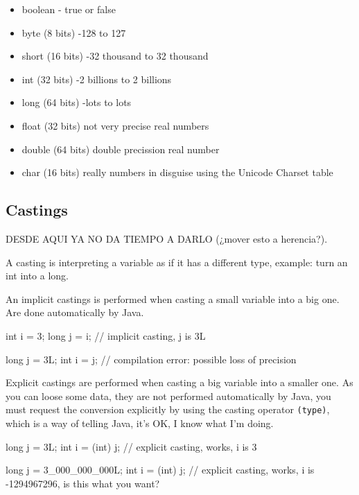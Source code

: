 \documentclass[8pt, a4paper, oneside]{extarticle}
\begin{document}
\begin{itemize}

  \item boolean - true or false

  \item byte (8 bits) -128 to 127

  \item short (16 bits) -32 thousand to 32 thousand

  \item int (32 bits) -2 billions to 2 billions

  \item long (64 bits) -lots to lots

  \item float (32 bits) not very precise real numbers

  \item double (64 bits) double precission real number

  \item char (16 bits) really numbers in disguise using the Unicode Charset table

\end{itemize}

\subsection{Castings}

DESDE AQUI YA NO DA TIEMPO A DARLO (¿mover esto a herencia?).

A casting is interpreting a variable as if it has a different type, example:
turn an int into a long.

An implicit castings is performed when casting a small variable into a big one.
Are done automatically by Java.

\begin{blackboard}
int i = 3;
long j = i; // implicit casting, j is 3L

long j = 3L;
int i = j; // compilation error: possible loss of precision
\end{blackboard}

Explicit castings are performed when casting a big variable into a smaller one.
As you can loose some data, they are not performed automatically by Java, you
must request the conversion explicitly by using the casting operator
\verb+(type)+, which is a way of telling Java, it's OK, I know what I'm doing.

\begin{blackboard}
long j = 3L;
int i = (int) j; // explicit casting, works, i is 3

long j = 3_000_000_000L;
int i = (int) j; // explicit casting, works, i is -1294967296, is this what you want?
\end{blackboard}
\end{document}
